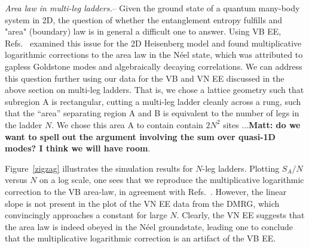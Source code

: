 \documentclass[prl,aps,twocolumn,floatfix,amsmath,amssymb,superscriptaddress,tightenlines]{revtex4}
\begin{document}
{\it Area law in multi-leg ladders.}--  
Given the ground state of a
quantum many-body system in 2D, the question of whether the entanglement
entropy fulfills and "area" (boundary) law is in general a difficult one
to answer.  
Using VB EE, Refs.~\cite{Alet,Chh} examined this issue for the 2D Heisenberg model and found
multiplicative logarithmic corrections to the area law in the N\'eel
state, which was attributed to gapless Goldstone modes and
algebraically decaying correlations.  
We can address this question further using our data for the VB and VN EE discussed 
in the above section on multi-leg ladders.  That is, we chose a lattice
geometry such that subregion A is rectangular, cutting a multi-leg ladder
cleanly across a rung, such that the ``area'' separating region A and B is
equivalent to the number of legs in the ladder $N$.  We chose this area A
to contain contain $2N^2$ sites ...{\bf Matt: do we want to spell out the
argument involving the sum over quasi-1D modes?  I think we will have
room}.

Figure~\ref{zigzag} illustrates the simulation results for $N$-leg ladders.
Plotting $S_A/N$ versus $N$ on a log scale, one sees that we reproduce the
multiplicative logarithmic correction to the VB area-law, in agreement
with Refs.~\cite{Alet,Chh}.  However, the linear slope is not present in
the plot of the VN EE data from the DMRG, which convincingly approaches a
constant for large $N$.  Clearly, the VN EE suggests that the area law is
indeed obeyed in the N\'eel groundstate, leading one to conclude that the
multiplicative logarithmic correction is an artifact of the VB EE.

\end{document}
